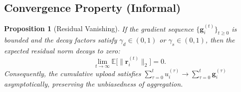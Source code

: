 \documentclass{article}
\newtheorem{proposition}{Proposition}
\begin{document}
\subsection*{Convergence Property (Informal)}

\begin{proposition}[Residual Vanishing]
If the gradient sequence $\{\mathbf{g}_i^{(t)}\}_{t\ge 0}$ is bounded and the decay factors satisfy $\gamma_d \in (0,1)$ or $\gamma_s \in (0,1)$, then the expected residual norm decays to zero:
\begin{equation}
\lim_{t\to\infty} \mathbb{E}\bigl[\|\mathbf{r}_i^{(t)}\|_2\bigr] = 0.
\end{equation}
Consequently, the cumulative upload satisfies $\sum_{\tau=0}^{t} u_i^{(\tau)} \to \sum_{\tau=0}^{t} \mathbf{g}_i^{(\tau)}$ asymptotically, preserving the unbiasedness of aggregation.
\end{proposition}
\end{document}
